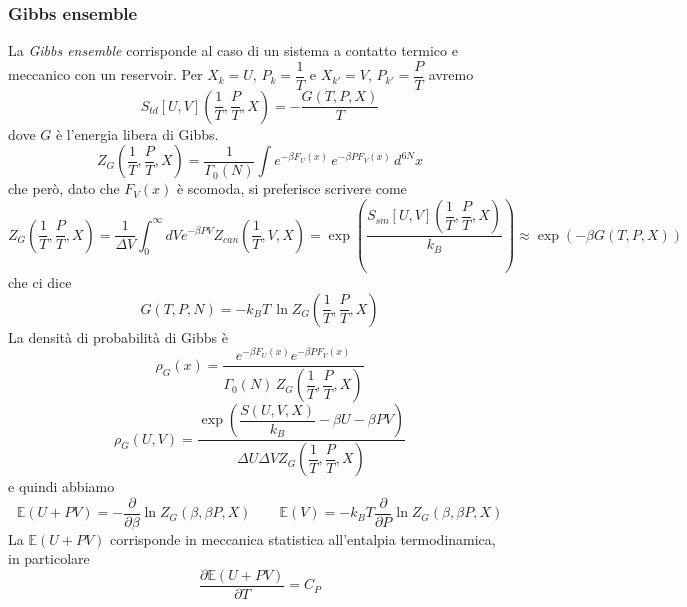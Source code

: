 \documentclass[11pt,a4paper,twoside]{book}
\numberwithin{equation}{section} %
\begin{document}
\subsubsection{Gibbs ensemble}
La \textit{Gibbs ensemble} corrisponde al caso di un sistema a contatto termico e meccanico con un reservoir.
Per $X_k=U,\, P_k=\dfrac{1}{T}$ e $X_{k'}=V,\, P_{k'}=\dfrac{P}{T}$ avremo
\[
S_{td}[U,V]\left(\dfrac{1}{T},\dfrac{P}{T},X\right)=-\dfrac{G(T,P,X)}{T}
\]
dove $G$ è l'energia libera di Gibbs.
\[
Z_{G}\left(\dfrac{1}{T},\dfrac{P}{T},X\right)=\dfrac{1}{\Gamma_0(N)}\int e^{-\beta F_U(x)}\,e^{-\beta PF_V(x)}\,d^{6N}x
\]
che però, dato che $F_V(x)$ è scomoda, si preferisce scrivere come
\[
Z_G\left(\dfrac{1}{T},\dfrac{P}{T},X\right)=\dfrac{1}{\Delta V}\int_0^\infty dV e^{-\beta P V}Z_{can}\left(\dfrac{1}{T},V,X\right)=\exp{\left(\dfrac{S_{sm}[U,V]\left(\dfrac{1}{T},\dfrac{P}{T},X\right)}{k_B} \right)}\approx \exp{\left( -\beta G(T,P,X) \right)}
\]
che ci dice
\begin{equation}
G(T,P,N)=-k_BT\,\ln Z_G\left(\dfrac{1}{T},\dfrac{P}{T},X\right)
\end{equation}
La densità di probabilità di Gibbs è
\begin{equation}
\rho_{G}(x)=\dfrac{e^{-\beta F_U(x)}e^{-\beta P F_V(x)}}{\Gamma_0(N)\,Z_G\left(\dfrac{1}{T},\dfrac{P}{T},X\right)}
\end{equation}
\[
\rho_{G}(U,V)=\dfrac{\exp{\left( \dfrac{S(U,V,X)}{k_B}-\beta U-\beta P V \right)}}{\Delta U\Delta V Z_G\left(\dfrac{1}{T},\dfrac{P}{T},X\right)}
\]
e quindi abbiamo
\[
\mathbb{E}(U+PV)=-\dfrac{\partial}{\partial \beta}\ln Z_G(\beta,\beta P, X) \qquad \mathbb{E}(V)=-k_B T\dfrac{\partial}{\partial P}\ln Z_G(\beta, \beta P,X)
\]
La $\mathbb{E}(U+PV)$ corrisponde in meccanica statistica all'entalpia termodinamica, in particolare
\[
\dfrac{\partial\mathbb{E}(U+PV)}{\partial T}=C_P
\]
\end{document}
